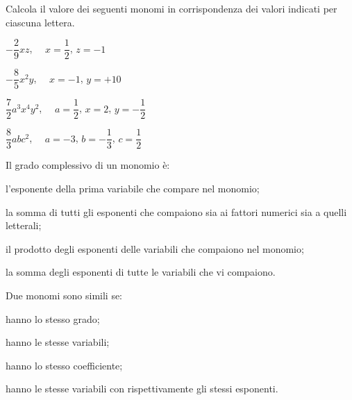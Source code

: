 \begin{esercizio}
\label{ese:9.5}
Calcola il valore dei seguenti monomi in corrispondenza dei valori 
indicati per ciascuna lettera.

\begin{htmulticols}{2}
\begin{enumeratea}
\spazielenx
\item \(-\dfrac{2}{9}xz\),~~ \( x=\dfrac{1}{2}\), \(z=-1\)
\item \(-\dfrac{8}{5}x^{2}y\),~~ \( x=-1 \), \(y=+10\)
\item \(\dfrac{7}{2}a^{3}x^{4}y^2\),~~ \( a=\dfrac{1}{2}\), \(x=2\), 
\(y=-\dfrac{1}{2}\)
\item \(\dfrac{8}{3}abc^2\),~~ \( a=-3 \), 
\(b=-\dfrac{1}{3}\), \(c=\dfrac{1}{2}\)
\end{enumeratea}
\end{htmulticols}
\end{esercizio}


\begin{esercizio}
\label{ese:9.6}
Il grado complessivo di un monomio è:

\begin{enumeratea}
\item l'esponente della prima variabile che compare nel monomio;
\item la somma di tutti gli esponenti che compaiono sia ai fattori
numerici sia a quelli letterali;
\item il prodotto degli esponenti delle variabili che compaiono nel 
monomio;
\item la somma degli esponenti di tutte le variabili che vi compaiono.
\end{enumeratea}
\end{esercizio}

\begin{esercizio}
\label{ese:9.7}
Due monomi sono simili se:

\begin{enumeratea}
\item hanno lo stesso grado;
\item hanno le stesse variabili;
\item hanno lo stesso coefficiente;
\item hanno le stesse variabili con rispettivamente gli stessi esponenti.
\end{enumeratea}
\end{esercizio}

